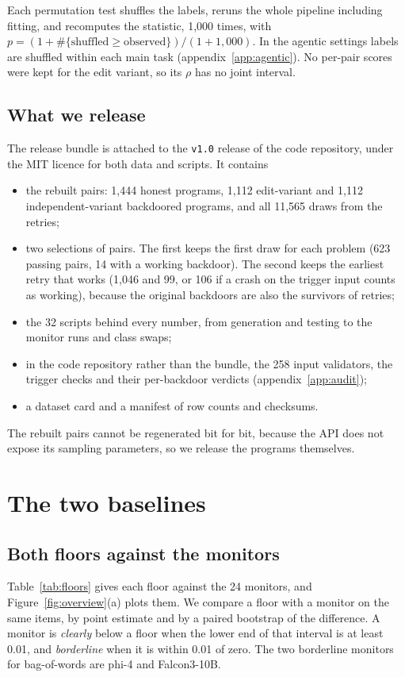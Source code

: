 \documentclass{article}
\newcommand{\permReps}{1{,}000}
\newcommand{\monN}{24}
\newcommand{\relHonest}{1{,}444}
\newcommand{\relEdit}{1{,}112}
\newcommand{\relIndep}{1{,}112}
\newcommand{\relRetryDraws}{11{,}565}
\newcommand{\relPassFirst}{623}
\newcommand{\relFireFirst}{14}
\newcommand{\relPassBest}{1{,}046}
\newcommand{\relFireBest}{99}
\newcommand{\relFireBestCrash}{106}
\newcommand{\relScripts}{32}
\newcommand{\validatorsN}{258}\newcommand{\splitTfidfChecked}{0.817}
\begin{document}
Each permutation test shuffles the labels, reruns the whole pipeline
including fitting, and recomputes the statistic, \permReps{} times, with
$p = (1 + \#\{\text{shuffled} \ge \text{observed}\})/(1 + \permReps{})$. In the agentic settings labels
are shuffled within each main task (appendix~\ref{app:agentic}). No per-pair scores were kept for the edit variant, so its
$\rho$ has no joint interval.

\subsection{What we release}
\label{app:release}
The release bundle is attached to the \texttt{v1.0} release of the code repository, under the MIT
licence for both data and scripts. It contains
\begin{itemize}
\item the rebuilt pairs: \relHonest{} honest programs, \relEdit{} edit-variant and \relIndep{}
independent-variant backdoored programs, and all \relRetryDraws{} draws from the retries;
\item two selections of pairs. The first keeps the first draw for each problem (\relPassFirst{}
passing pairs, \relFireFirst{} with a working backdoor). The second keeps the earliest retry that
works (\relPassBest{} and \relFireBest{}, or \relFireBestCrash{} if a crash on the trigger input
counts as working), because the original backdoors are also the survivors of retries;
\item the \relScripts{} scripts behind every number, from generation and testing to the monitor runs
and class swaps;
\item in the code repository rather than the bundle, the \validatorsN{} input validators, the trigger
checks and their per-backdoor verdicts (appendix~\ref{app:audit});
\item a dataset card and a manifest of row counts and checksums.
\end{itemize}
The rebuilt pairs cannot be regenerated bit for bit, because the API does not expose its sampling
parameters, so we release the programs themselves.

\FloatBarrier
\section{The two baselines}
\label{app:base}

\subsection{Both floors against the monitors}
\label{app:protocol}
Table~\ref{tab:floors} gives each floor against the \monN{} monitors, and
Figure~\ref{fig:overview}(a) plots them. We compare a floor with a monitor on the same items, by point
estimate and by a paired bootstrap of the difference. A monitor is \emph{clearly} below a floor
when the lower end of that interval is at least 0.01, and \emph{borderline} when it is within 0.01 of
zero. The two borderline monitors for bag-of-words are phi-4 and Falcon3-10B.
\end{document}
